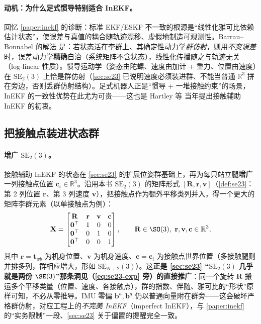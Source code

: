 \paragraph{动机：为什么足式惯导特别适合 InEKF。}
回忆 \cref{paper:inekf} 的诊断：标准 EKF/ESKF 不一致的根源是“线性化雅可比依赖估计状态”，使误差与真值的耦合随轨迹漂移、虚假地制造可观测性。Barrau--Bonnabel 的解法\cite{barrau2017invariant} 是：若状态活在李群上、其确定性动力学\emph{群仿射}，则用\emph{不变误差}时，误差动力学\textbf{精确}自治（系统矩阵不含状态），线性化传播随之与轨迹无关（log-linear 性质）。惯导运动学（姿态由陀螺、速度由加计 + 重力、位置由速度）在 $\mathrm{SE}_2(3)$ 上恰是群仿射（\cref{sec:se23} 已说明速度必须装进群、不能当普通 $\mathbb{R}^3$ 拼在旁边，否则丢群仿射结构）。足式机器人正是“惯导 + 一堆接触约束”的场景，InEKF 的一致性优势在此尤为可贵——这也是 Hartley 等\cite{hartley2020contact} 当年提出接触辅助 InEKF 的初衷。

\subsection{把接触点装进状态群}
\label{subsec:leg-inekf-state}

\paragraph{增广 $\mathrm{SE}_2(3)$。}
接触辅助 InEKF 的状态在 \cref{sec:se23} 的扩展位姿群基础上，再为每只站立腿\textbf{增广}一列接触点位置 $\mathbf{c}_i\in\mathbb{R}^3$。沿用本书 $\mathrm{SE}_2(3)$ 的矩阵形式 $[\mathbf{R},\mathbf{r},\mathbf{v}]$（\cref{def:se23}：第 2 列位置 $\mathbf{r}$、第 3 列速度 $\mathbf{v}$），把接触点作为额外平移类列并入，得一个更大的矩阵李群元素（以单接触点为例）：
\begin{equation}
  \mathbf{X}=\begin{bmatrix}\mathbf{R} & \mathbf{r} & \mathbf{v} & \mathbf{c}\\\mathbf{0}^\top & 1 & 0 & 0\\\mathbf{0}^\top & 0 & 1 & 0\\\mathbf{0}^\top & 0 & 0 & 1\end{bmatrix},\qquad \mathbf{R}\in\SO(3),\ \mathbf{r},\mathbf{v},\mathbf{c}\in\mathbb{R}^3,
  \label{eq:leg-inekf-state}
\end{equation}
其中 $\mathbf{r}=\mathbf{t}_{wb}$ 为机身位置、$\mathbf{v}$ 为机身速度、$\mathbf{c}=\mathbf{c}_i$ 为接触点世界位置（多接触腿则并排多列，群相应增大，形如 $\mathrm{SE}_{K+2}(3)$）。这\textbf{正是 \cref{sec:se23} “$\mathrm{SE}_2(3)$ 几乎就是两份 $\SE(3)$”那条洞见（\cref{eq:se23-exp} 旁）的直接推广}：同一个旋转 $\mathbf{R}$ 搬运多个平移类量（位置、速度、各接触点），群的指数、伴随、雅可比的“形状”原样可知，不必从零推导。IMU 零偏 $\mathbf{b}^a,\mathbf{b}^g$ 仍以普通向量附在群旁——这会破坏严格群仿射，对应工程上的\emph{不完美 InEKF}（imperfect InEKF），与 \cref{paper:inekf} 的“实务限制”一段、\cref{sec:se23} 关于偏置的提醒完全一致。

